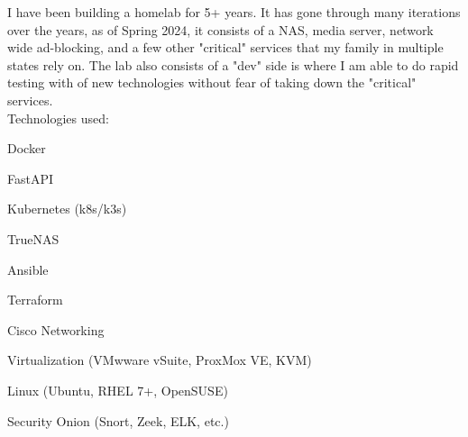 \documentclass[a4paper,10pt]{article}
\begin{document}
I have been building a homelab for 5+ years. It has gone through many iterations over the years, as of Spring 2024, it consists of a NAS, media server, network wide ad-blocking, and a few other "critical" services that my family in multiple states rely on. The lab also consists of a "dev" side is where I am able to do rapid testing with of new technologies without fear of taking down the "critical" services. 
\\
Technologies used:
\begin{itemize}
    \small
    \begin{multicols}{2}
    \item Docker
    \item FastAPI
    \item Kubernetes (k8s/k3s)
    \item TrueNAS
    \item Ansible
    \item Terraform
    \item Cisco Networking
    \item Virtualization (VMwware vSuite, ProxMox VE, KVM)
    \item Linux (Ubuntu, RHEL 7+, OpenSUSE)
    \item Security Onion (Snort, Zeek, ELK, etc.)
    \end{multicols}
\end{itemize}
\end{document}
